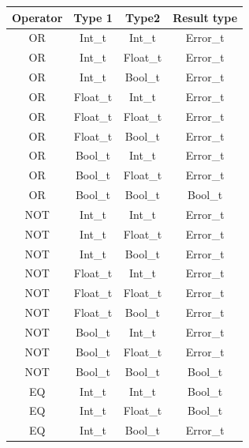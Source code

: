 \begin{figure}[H]
    \centering
    \begin{tabular}{cccc}
        \toprule
        \textbf{Operator} & \textbf{Type 1} & \textbf{Type2} & \textbf{Result type}\\
        \midrule OR & Int\_t & Int\_t      & Error\_t \\
        \midrule OR & Int\_t & Float\_t    & Error\_t \\
        \midrule OR & Int\_t & Bool\_t     & Error\_t \\

        \midrule OR & Float\_t & Int\_t    & Error\_t \\
        \midrule OR & Float\_t & Float\_t  & Error\_t \\
        \midrule OR & Float\_t & Bool\_t   & Error\_t \\

        \midrule OR & Bool\_t & Int\_t     & Error\_t \\
        \midrule OR & Bool\_t & Float\_t   & Error\_t \\
        \midrule OR & Bool\_t & Bool\_t    & Bool\_t \\

        \midrule NOT & Int\_t & Int\_t      & Error\_t \\
        \midrule NOT & Int\_t & Float\_t    & Error\_t \\
        \midrule NOT & Int\_t & Bool\_t     & Error\_t \\

        \midrule NOT & Float\_t & Int\_t    & Error\_t \\
        \midrule NOT & Float\_t & Float\_t  & Error\_t \\
        \midrule NOT & Float\_t & Bool\_t   & Error\_t \\

        \midrule NOT & Bool\_t & Int\_t     & Error\_t \\
        \midrule NOT & Bool\_t & Float\_t   & Error\_t \\
        \midrule NOT & Bool\_t & Bool\_t    & Bool\_t \\

        \midrule EQ & Int\_t & Int\_t      & Bool\_t \\
        \midrule EQ & Int\_t & Float\_t    & Bool\_t \\
        \midrule EQ & Int\_t & Bool\_t     & Error\_t \\


\end{tabular}
\end{figure}
